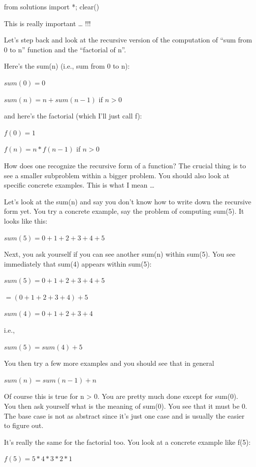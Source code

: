 \begin{python0}
from solutions import *; clear()
\end{python0}

This is really important \ldots{} !!!

Let's step back and look at the recursive version of the
computation of ``sum from 0 to n'' function and the ``factorial of n''.

Here's the sum(n) (i.e., sum from 0 to n):

$sum(0) = 0$

$sum(n) = n + sum(n - 1)$ if $n > 0$

and here's the factorial (which I'll
just call f):

$f(0) = 1$

$f(n) = n * f(n - 1)$ if $n > 0$

How does one recognize the recursive form of a function? The crucial
thing is to see a smaller subproblem within a bigger problem. You should
also look at specific concrete examples. This is what I mean \ldots{}

Let's look at the sum(n) and say you
don't know how to write down the recursive form yet. You
try a concrete example, say the problem of computing sum(5). It looks
like this:

$sum(5) = 0 + 1 + 2 + 3 + 4 + 5$

Next, you ask yourself if you can see another sum(n) within sum(5). You
see immediately that sum(4) appears within sum(5):

$sum(5) = 0 + 1 + 2 + 3 + 4 + 5$

$= (0 + 1 + 2 + 3 + 4) + 5$

$sum(4) = 0 + 1 + 2 + 3 + 4$

i.e.,

$sum(5) = sum(4) + 5$

You then try a few more examples and you should see that in general

$sum(n) = sum(n - 1) + n$

Of course this is true for n > 0. You are pretty much done
except for sum(0). You then ask yourself what is the meaning of sum(0).
You see that it must be 0. The base case is not as abstract since
it's just one case and is usually the easier to figure
out.

It's really the same for the factorial too. You look at
a concrete example like f(5):

$f(5) = 5 * 4 * 3 * 2 * 1$

